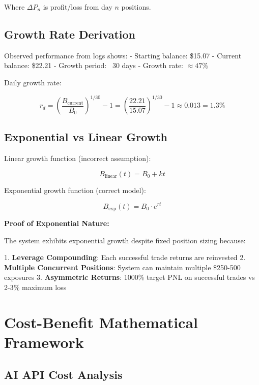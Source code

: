 \documentclass{article}
\begin{document}
Where $\Delta P_n$ is profit/loss from day $n$ positions.

\subsection{Growth Rate Derivation}

Observed performance from logs shows:
- Starting balance: \$15.07
- Current balance: \$22.21
- Growth period: ~30 days
- Growth rate: $\approx 47\%$

Daily growth rate:

\begin{equation}
r_d = \left(\frac{B_{\text{current}}}{B_0}\right)^{1/30} - 1 = \left(\frac{22.21}{15.07}\right)^{1/30} - 1 \approx 0.013 = 1.3\%
\end{equation}

\subsection{Exponential vs Linear Growth}

Linear growth function (incorrect assumption):

\begin{equation}
B_{\text{linear}}(t) = B_0 + kt
\end{equation}

Exponential growth function (correct model):

\begin{equation}
B_{\text{exp}}(t) = B_0 \cdot e^{rt}
\end{equation}

\textbf{Proof of Exponential Nature:}

The system exhibits exponential growth despite fixed position sizing because:

1. \textbf{Leverage Compounding}: Each successful trade returns are reinvested
2. \textbf{Multiple Concurrent Positions}: System can maintain multiple \$250-500 exposures
3. \textbf{Asymmetric Returns}: 1000\% target PNL on successful trades vs 2-3\% maximum loss

\section{Cost-Benefit Mathematical Framework}

\subsection{AI API Cost Analysis}
\end{document}
